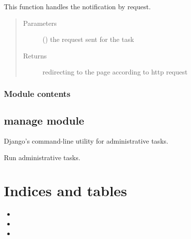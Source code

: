 \documentclass[letterpaper,10pt,english]{sphinxmanual}
\begin{document}
\begin{fulllineitems}
\label{\detokenize{janta:janta.views.user_home}}
This function handles the notification by request.
\begin{quote}\begin{description}
\item[{Parameters}] \leavevmode
{} () \textendash{} the request sent for the task

\item[{Returns}] \leavevmode
redirecting to the page according to http request

\end{description}\end{quote}

\end{fulllineitems}



\subsection{Module contents}
\label{\detokenize{janta:module-janta}}\label{\detokenize{janta:module-contents}}

\section{manage module}
\label{\detokenize{manage:module-manage}}\label{\detokenize{manage:manage-module}}\label{\detokenize{manage::doc}}
Django’s command-line utility for administrative tasks.

\begin{fulllineitems}
\label{\detokenize{manage:manage.main}}
Run administrative tasks.

\end{fulllineitems}



\chapter{Indices and tables}
\label{\detokenize{index:indices-and-tables}}\begin{itemize}
\item {} 

\item {} 

\item {} 

\end{itemize}
\end{document}
